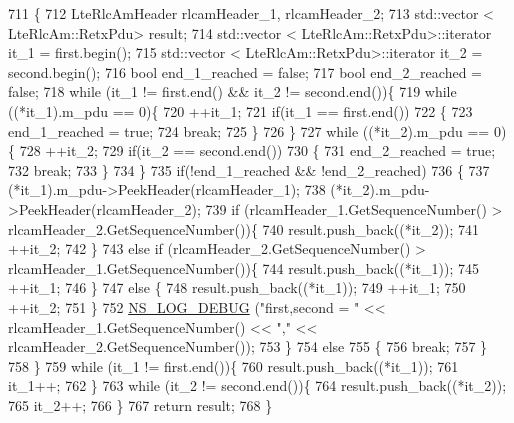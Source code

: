 \begin{DoxyCode}
711 \{
712   LteRlcAmHeader rlcamHeader\_1, rlcamHeader\_2;
713   std::vector < LteRlcAm::RetxPdu> result;
714   std::vector < LteRlcAm::RetxPdu>::iterator it\_1 = first.begin();
715   std::vector < LteRlcAm::RetxPdu>::iterator it\_2 = second.begin();
716   \textcolor{keywordtype}{bool} end\_1\_reached = \textcolor{keyword}{false};
717   \textcolor{keywordtype}{bool} end\_2\_reached = \textcolor{keyword}{false};
718   \textcolor{keywordflow}{while} (it\_1 != first.end() && it\_2 != second.end())\{
719     \textcolor{keywordflow}{while} ((*it\_1).m\_pdu == 0)\{
720       ++it\_1;
721       \textcolor{keywordflow}{if}(it\_1 == first.end())
722       \{
723         end\_1\_reached = \textcolor{keyword}{true};
724         \textcolor{keywordflow}{break};
725       \}
726     \}
727     \textcolor{keywordflow}{while} ((*it\_2).m\_pdu == 0)\{
728       ++it\_2;
729       \textcolor{keywordflow}{if}(it\_2 == second.end())
730       \{
731         end\_2\_reached = \textcolor{keyword}{true};
732         \textcolor{keywordflow}{break};
733       \}
734     \}
735     \textcolor{keywordflow}{if}(!end\_1\_reached && !end\_2\_reached)
736     \{
737       (*it\_1).m\_pdu->PeekHeader(rlcamHeader\_1);
738       (*it\_2).m\_pdu->PeekHeader(rlcamHeader\_2);
739       \textcolor{keywordflow}{if} (rlcamHeader\_1.GetSequenceNumber() > rlcamHeader\_2.GetSequenceNumber())\{
740         result.push\_back((*it\_2));  
741         ++it\_2;       
742       \}
743       \textcolor{keywordflow}{else} \textcolor{keywordflow}{if} (rlcamHeader\_2.GetSequenceNumber() > rlcamHeader\_1.GetSequenceNumber())\{
744         result.push\_back((*it\_1));
745         ++it\_1;         
746       \}
747       \textcolor{keywordflow}{else} \{
748         result.push\_back((*it\_1));
749         ++it\_1;
750         ++it\_2;
751       \}
752       \hyperlink{group__logging_ga413f1886406d49f59a6a0a89b77b4d0a}{NS\_LOG\_DEBUG} (\textcolor{stringliteral}{"first,second = "} << rlcamHeader\_1.GetSequenceNumber() << \textcolor{stringliteral}{","} << 
      rlcamHeader\_2.GetSequenceNumber());
753     \}
754     \textcolor{keywordflow}{else}
755     \{
756       \textcolor{keywordflow}{break};
757     \}
758   \}
759   \textcolor{keywordflow}{while} (it\_1 != first.end())\{
760     result.push\_back((*it\_1));
761     it\_1++;
762   \}
763   \textcolor{keywordflow}{while} (it\_2 != second.end())\{
764     result.push\_back((*it\_2));
765     it\_2++;
766   \}
767   \textcolor{keywordflow}{return} result;
768 \}
\end{DoxyCode}


